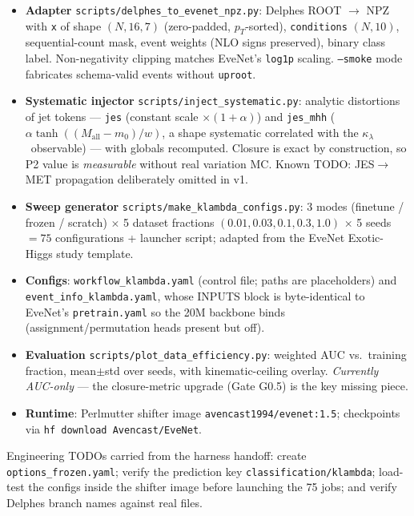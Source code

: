 \documentclass[11pt]{article}
\newcommand{\kl}{\ensuremath{\kappa_\lambda}}
\begin{document}
\begin{itemize}
\item \textbf{Adapter} \texttt{scripts/delphes\_to\_evenet\_npz.py}:
  Delphes ROOT $\to$ NPZ with \texttt{x} of shape $(N,16,7)$ (zero-padded,
  $p_T$-sorted), \texttt{conditions} $(N,10)$, sequential-count mask,
  event weights (NLO signs preserved), binary class label. Non-negativity
  clipping matches EveNet's \texttt{log1p} scaling. \texttt{--smoke} mode
  fabricates schema-valid events without \texttt{uproot}.
\item \textbf{Systematic injector} \texttt{scripts/inject\_systematic.py}:
  analytic distortions of jet tokens --- \texttt{jes} (constant scale
  $\times(1+\alpha)$) and \texttt{jes\_mhh}
  ($\alpha\tanh((M_{\mathrm{all}}-m_0)/w)$, a shape systematic correlated
  with the \kl\ observable) --- with globals recomputed. Closure is exact by
  construction, so P2 value is \emph{measurable} without real variation MC.
  Known TODO: JES$\to$MET propagation deliberately omitted in v1.
\item \textbf{Sweep generator} \texttt{scripts/make\_klambda\_configs.py}:
  3 modes (finetune / frozen / scratch) $\times$ 5 dataset fractions
  $(0.01,0.03,0.1,0.3,1.0)$ $\times$ 5 seeds $=75$ configurations +
  launcher script; adapted from the EveNet Exotic-Higgs study template.
\item {\sloppy \textbf{Configs}: \texttt{workflow\_klambda.yaml} (control
  file; paths are placeholders) and \texttt{event\_info\_klambda.yaml},
  whose INPUTS block is byte-identical to EveNet's \texttt{pretrain.yaml}
  so the 20M backbone binds (assignment/permutation heads present but
  off).\par}
\item \textbf{Evaluation} \texttt{scripts/plot\_data\_efficiency.py}:
  weighted AUC vs.\ training fraction, mean$\pm$std over seeds, with
  kinematic-ceiling overlay. \emph{Currently AUC-only} --- the closure-metric
  upgrade (Gate G0.5) is the key missing piece.
\item \textbf{Runtime}: Perlmutter shifter image
  \texttt{avencast1994/evenet:1.5}; checkpoints via
  \texttt{hf download Avencast/EveNet}.
\end{itemize}

\noindent Engineering TODOs carried from the harness handoff: create
\texttt{options\_frozen.yaml}; verify the prediction key
\texttt{classification/klambda}; load-test the configs inside the shifter
image before launching the 75 jobs; and verify Delphes branch names
against real files.
\end{document}
